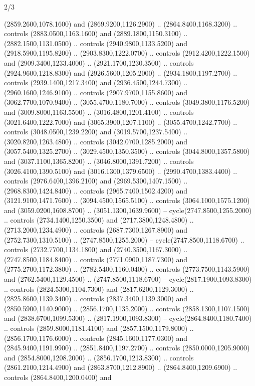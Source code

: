 \begin{flagdescription}{2/3}
\begin{scope}[shift={(0.5\flaglength,0.5)},scale=\flagwidth/130]
\begin{scope}[y=0.01mm, x=0.01mm,shift={(-3365,-2250)}]
  (2859.2600,1078.1600) and (2869.9200,1126.2900) .. (2864.8400,1168.3200) ..
  controls (2883.0500,1163.1600) and (2889.1800,1150.3100) ..
  (2882.1500,1131.0500) .. controls (2940.9800,1133.5200) and
  (2918.5900,1195.8200) .. (2903.8300,1222.0700) .. controls
  (2912.4200,1222.1500) and (2909.3400,1233.4000) .. (2921.1700,1230.3500) ..
  controls (2924.9600,1218.8300) and (2926.5600,1205.2000) ..
  (2934.1800,1197.2700) .. controls (2939.1400,1217.3400) and
  (2936.4500,1244.7300) .. (2960.1600,1246.9100) .. controls
  (2907.9700,1155.8600) and (3062.7700,1070.9400) .. (3055.4700,1180.7000) ..
  controls (3049.3800,1176.5200) and (3009.8000,1163.5500) ..
  (3016.4800,1201.4100) .. controls (3021.6400,1222.7000) and
  (3065.3900,1207.1100) .. (3055.4700,1242.7700) .. controls
  (3048.0500,1239.2200) and (3019.5700,1237.5400) .. (3020.8200,1263.4800) ..
  controls (3042.0700,1285.2000) and (3057.5400,1325.2700) ..
  (3029.4500,1350.3500) .. controls (3044.8000,1357.5800) and
  (3037.1100,1365.8200) .. (3046.8000,1391.7200) .. controls
  (3026.4100,1390.5100) and (3016.1300,1379.6500) .. (2990.4700,1383.4400) ..
  controls (2976.6400,1396.2100) and (2969.5300,1407.1500) ..
  (2968.8300,1424.8400) .. controls (2965.7400,1502.4200) and
  (3121.9100,1471.7600) .. (3094.4500,1565.5100) .. controls
  (3064.1000,1575.1200) and (3059.0200,1608.8700) .. (3051.1300,1639.9600) --
  cycle(2747.8500,1255.2000) .. controls (2734.1400,1250.3500) and
  (2717.3800,1248.4800) .. (2713.2000,1234.4900) .. controls
  (2687.7300,1267.8900) and (2752.7300,1310.5100) .. (2747.8500,1255.2000) --
  cycle(2747.8500,1118.6700) .. controls (2732.7700,1134.1800) and
  (2740.3500,1167.3000) .. (2747.8500,1184.8400) .. controls
  (2771.0900,1187.7300) and (2775.2700,1172.3800) .. (2782.5400,1160.0400) ..
  controls (2773.7500,1143.5900) and (2762.5400,1129.4500) ..
  (2747.8500,1118.6700) -- cycle(2817.1900,1093.8300) .. controls
  (2824.5300,1104.7300) and (2817.6200,1129.3000) .. (2825.8600,1139.3400) ..
  controls (2837.3400,1139.3000) and (2850.5900,1140.9000) ..
  (2856.1700,1135.2000) .. controls (2858.1300,1107.1500) and
  (2838.6700,1099.5300) .. (2817.1900,1093.8300) -- cycle(2864.8400,1180.7400)
  .. controls (2859.8000,1181.4100) and (2857.1500,1179.8000) ..
  (2856.1700,1176.6000) .. controls (2845.1600,1177.0300) and
  (2845.9400,1191.9900) .. (2851.8400,1197.2700) .. controls
  (2850.0000,1205.9000) and (2854.8000,1208.2000) .. (2856.1700,1213.8300) ..
  controls (2861.2100,1214.4900) and (2863.8700,1212.8900) ..
  (2864.8400,1209.6900) .. controls (2864.8400,1200.0400) and

\end{scope}
\end{scope}
\end{flagdescription}
